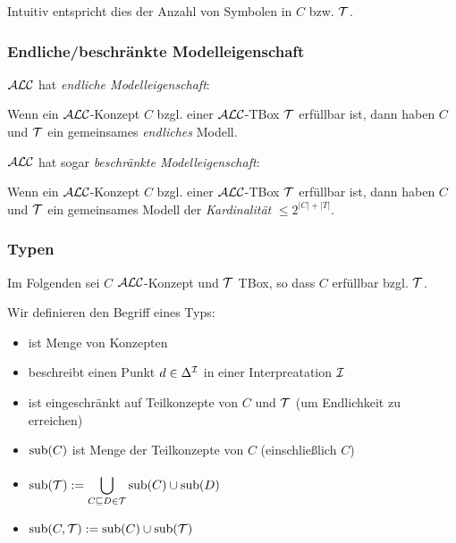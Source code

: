 Intuitiv entspricht dies der Anzahl von Symbolen in $C$ bzw. $\mathcal{T}$.

\subsubsection{Endliche/beschränkte Modelleigenschaft}

$\mathcal{A}\mathcal{L}\mathcal{C}$ hat \emph{endliche Modelleigenschaft}:

\begin{theorem}
Wenn ein $\mathcal{A}\mathcal{L}\mathcal{C}$-Konzept $C$ bzgl. einer $\mathcal{A}\mathcal{L}\mathcal{C}$-TBox $\mathcal{T}$ erfüllbar ist, dann haben $C$ und $\mathcal{T}$ ein gemeinsames \emph{endliches} Modell.
\end{theorem}

$\mathcal{A}\mathcal{L}\mathcal{C}$ hat sogar \emph{beschränkte Modelleigenschaft}:

\begin{theorem}
Wenn ein $\mathcal{A}\mathcal{L}\mathcal{C}$-Konzept $C$ bzgl. einer $\mathcal{A}\mathcal{L}\mathcal{C}$-TBox $\mathcal{T}$ erfüllbar ist, dann haben $C$ und $\mathcal{T}$ ein gemeinsames Modell der \emph{Kardinalität} $\leq 2^{|C|+|T|}$.
\end{theorem}

\subsubsection{Typen}
\label{sec:typ}

Im Folgenden sei $C$ $\mathcal{A}\mathcal{L}\mathcal{C}$-Konzept und $\mathcal{T}$ TBox, so dass $C$ erfüllbar bzgl. $\mathcal{T}$.

Wir definieren den Begriff eines Typs:

\begin{itemize}
  \item ist Menge von Konzepten
  \item beschreibt einen Punkt $d \in \Delta^{\mathcal{I}}$ in einer Interpreatation $\mathcal{I}$
  \item ist eingeschränkt auf Teilkonzepte von $C$ und $\mathcal{T}$ (um Endlichkeit zu erreichen)
\end{itemize}

\begin{definition}[Teilkonzepte]\mbox{}

\begin{itemize}
\item
  $\sub\left( C \right)$ ist Menge der Teilkonzepte von $C$
  (einschließlich $C$)
\item
  $\displaystyle \sub\left( \MT \right) := \bigcup_{C \sqsubseteq D \in \MT}^{}{\sub\left( C \right) \cup \sub\left( D \right)}$
\item
  $\sub\left( C,\MT \right) := \sub\left( C \right) \cup \sub\left( \MT \right)$
\end{itemize}
\end{definition}


